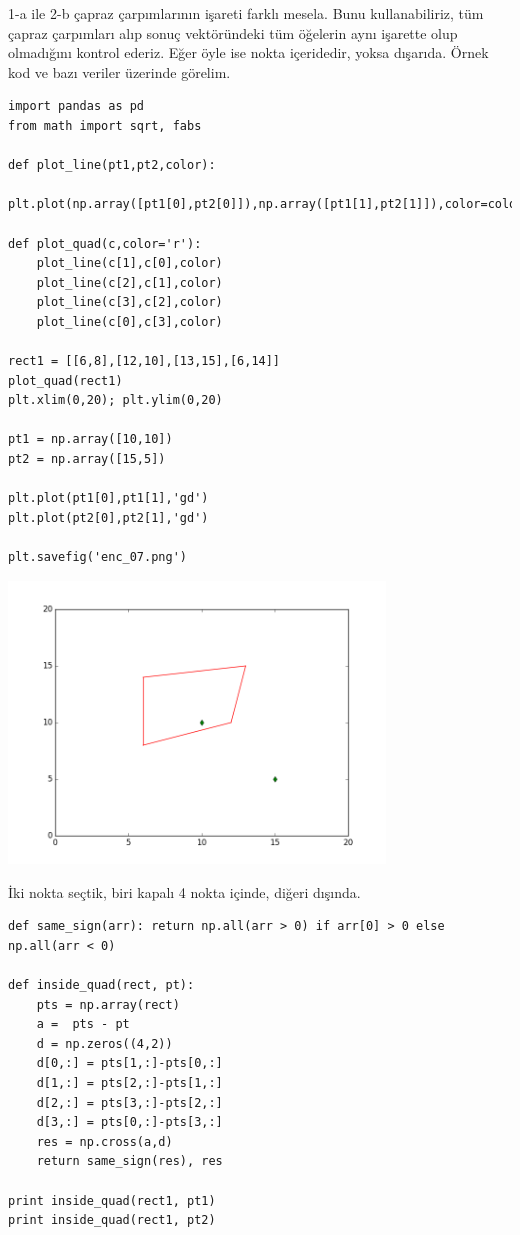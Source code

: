 \documentclass[12pt,fleqn]{article}\usepackage{../../common}
\begin{document}
1-a ile 2-b çapraz çarpımlarının işareti farklı mesela. Bunu kullanabiliriz, tüm
çapraz çarpımları alıp sonuç vektöründeki tüm öğelerin aynı işarette olup
olmadığını kontrol ederiz. Eğer öyle ise nokta içeridedir, yoksa dışarıda. Örnek
kod ve bazı veriler üzerinde görelim. 

\begin{verbatim}
import pandas as pd
from math import sqrt, fabs

def plot_line(pt1,pt2,color):
    plt.plot(np.array([pt1[0],pt2[0]]),np.array([pt1[1],pt2[1]]),color=color)
    
def plot_quad(c,color='r'):
    plot_line(c[1],c[0],color)
    plot_line(c[2],c[1],color)
    plot_line(c[3],c[2],color)
    plot_line(c[0],c[3],color)

rect1 = [[6,8],[12,10],[13,15],[6,14]]
plot_quad(rect1)
plt.xlim(0,20); plt.ylim(0,20)

pt1 = np.array([10,10])
pt2 = np.array([15,5])

plt.plot(pt1[0],pt1[1],'gd')
plt.plot(pt2[0],pt2[1],'gd')

plt.savefig('enc_07.png')
\end{verbatim}

\includegraphics[width=10cm]{enc_07.png}

İki nokta seçtik, biri kapalı 4 nokta içinde, diğeri dışında. 

\begin{verbatim}
def same_sign(arr): return np.all(arr > 0) if arr[0] > 0 else np.all(arr < 0)

def inside_quad(rect, pt):
    pts = np.array(rect)
    a =  pts - pt
    d = np.zeros((4,2))
    d[0,:] = pts[1,:]-pts[0,:]
    d[1,:] = pts[2,:]-pts[1,:]
    d[2,:] = pts[3,:]-pts[2,:]
    d[3,:] = pts[0,:]-pts[3,:]
    res = np.cross(a,d)
    return same_sign(res), res

print inside_quad(rect1, pt1)
print inside_quad(rect1, pt2)
\end{verbatim}
\end{document}
